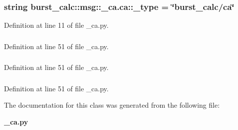 \subsubsection[{\-\_\-type}]{\setlength{\rightskip}{0pt plus 5cm}string {\bf burst\-\_\-calc\-::msg\-::\-\_\-ca.\-ca\-::\-\_\-type} = \char`\"{}burst\-\_\-calc/{\bf ca}\char`\"{}\hspace{0.3cm}{\ttfamily  [static, private]}}\label{classburst__calc_1_1msg_1_1__ca_1_1ca_ae22d262d932dfc6d7f92d06b400f6245}


\-Definition at line 11 of file \-\_\-ca.\-py.

\subsubsection[{header}]{}\label{classburst__calc_1_1msg_1_1__ca_1_1ca_aa04bc36c539f8627a45794ddec57031d}


\-Definition at line 51 of file \-\_\-ca.\-py.

\subsubsection[{x}]{}\label{classburst__calc_1_1msg_1_1__ca_1_1ca_a1fc1c4316516d23de2508a399ecc2b37}


\-Definition at line 51 of file \-\_\-ca.\-py.

\subsubsection[{y}]{}\label{classburst__calc_1_1msg_1_1__ca_1_1ca_a907375792057325f10a8ffc65def500e}


\-Definition at line 51 of file \-\_\-ca.\-py.



\-The documentation for this class was generated from the following file\-:\begin{DoxyCompactItemize}
\item 
{\bf \-\_\-ca.\-py}\end{DoxyCompactItemize}
